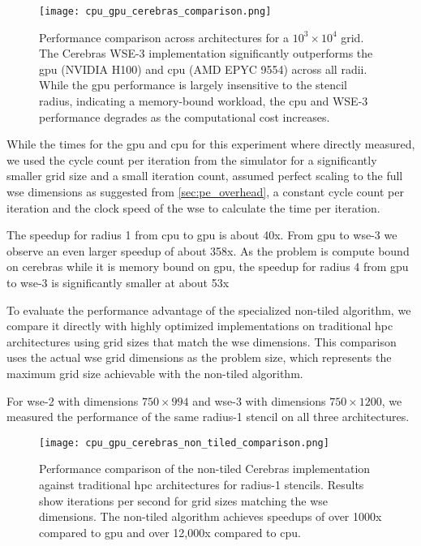 \begin{figure}[h]
    \centering
    \texttt{[image: cpu\_gpu\_cerebras\_comparison.png]}
    \caption{Performance comparison across architectures for a $10^3 \times 10^4$ grid. The Cerebras WSE-3 implementation significantly outperforms the \ac{gpu} (NVIDIA H100) and \ac{cpu} (AMD EPYC 9554) across all radii. While the \ac{gpu} performance is largely insensitive to the stencil radius, indicating a memory-bound workload, the \ac{cpu} and WSE-3 performance degrades as the computational cost increases.}
    \label{fig:cpu_gpu_cerebras_comparison}
\end{figure}

While the times for the \ac{gpu} and \ac{cpu} for this experiment where directly measured, we used the cycle count per iteration from the simulator for a significantly smaller grid size and a small iteration count, assumed perfect scaling to the full \ac{wse} dimensions as suggested from \autoref{sec:pe_overhead}, a constant cycle count per iteration and the clock speed of the \ac{wse} to calculate the time per iteration.

The speedup for radius 1 from \ac{cpu} to \ac{gpu} is about 40x. From \ac{gpu} to \ac{wse}-3 we observe an even larger speedup of about 358x. As the problem is compute bound on cerebras while it is memory bound on \ac{gpu}, the speedup for radius 4 from \ac{gpu} to \ac{wse}-3 is significantly smaller at about 53x

To evaluate the performance advantage of the specialized non-tiled algorithm, we compare it directly with highly optimized implementations on traditional \ac{hpc} architectures using grid sizes that match the \ac{wse} dimensions. This comparison uses the actual \ac{wse} grid dimensions as the problem size, which represents the maximum grid size achievable with the non-tiled algorithm.

For \ac{wse}-2 with dimensions $750 \times 994$ and \ac{wse}-3 with dimensions $750 \times 1200$, we measured the performance of the same radius-1 stencil on all three architectures.

\begin{figure}[h]
    \centering
    \texttt{[image: cpu\_gpu\_cerebras\_non\_tiled\_comparison.png]}
    \caption{Performance comparison of the non-tiled Cerebras implementation against traditional \ac{hpc} architectures for radius-1 stencils. Results show iterations per second for grid sizes matching the \ac{wse} dimensions. The non-tiled algorithm achieves speedups of over 1000x compared to \ac{gpu} and over 12,000x compared to \ac{cpu}.}
    \label{fig:cpu_gpu_cerebras_non_tiled_comparison}
\end{figure}

